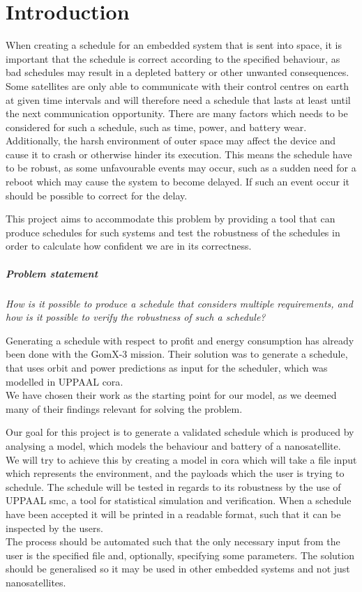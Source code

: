 \chapter{Introduction}\label{cha:intro}
When creating a schedule for an embedded system that is sent into space, it is important that the schedule is correct according to the specified behaviour, as bad schedules may result in a depleted battery or other unwanted consequences. 
Some satellites are only able to communicate with their control centres on earth at given time intervals and will therefore need a schedule that lasts at least until the next communication opportunity.
There are many factors which needs to be considered for such a schedule, such as time, power, and battery wear. 
Additionally, the harsh environment of outer space may affect the device and cause it to crash or otherwise hinder its execution.
This means the schedule have to be robust, as some unfavourable events may occur, such as a sudden need for a reboot which may cause the system to become delayed. If such an event occur it should be possible to correct for the delay.

This project aims to accommodate this problem by providing a tool that can produce schedules for such systems and test the robustness of the schedules in order to calculate how confident we are in its correctness.

\paragraph{Problem statement}
\textit{How is it possible to produce a schedule that considers multiple requirements, and how is it possible to verify the robustness of such a schedule?}

Generating a schedule with respect to profit and energy consumption has already been done with the GomX-3 mission\cite{gomx3}. 
Their solution was to generate a schedule, that uses orbit and power predictions as input for the scheduler, which was modelled in UPPAAL \gls{cora}.\\
We have chosen their work as the starting point for our model, as we deemed many of their findings relevant for solving the problem.

Our goal for this project is to generate a validated schedule which is produced by analysing a model, which models the behaviour and battery of a nanosatellite. \\
We will try to achieve this by creating a model in \gls{cora} which will take a file input which represents the environment, and the payloads which the user is trying to schedule.
The schedule will be tested in regards to its robustness by the use of UPPAAL \gls{smc}, a tool for statistical simulation and verification. 
When a schedule have been accepted it will be printed in a readable format, such that it can be inspected by the users. \\
The process should be automated such that the only necessary input from the user is the specified file and, optionally, specifying some parameters. 
The solution should be generalised so it may be used in other embedded systems and not just nanosatellites.


